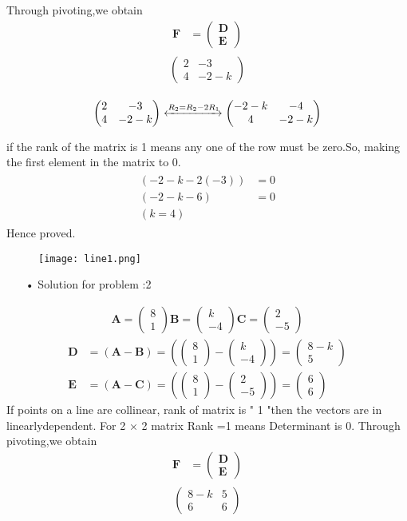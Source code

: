 \documentclass[12pt]{article}
\newcommand{\myvec}[1]{\ensuremath{\begin{pmatrix}#1\end{pmatrix}}}
\let\vec\mathbf
\providecommand{\brak}[1]{\ensuremath{\left(#1\right)}}
\let\vec\mathbf
\begin{document}
Through pivoting,we obtain
\begin{align}
\vec{F} &={\myvec{\vec{D}\\ \vec{E}}}
\end{align}
\begin{align}
\begin{split}
\myvec{
2 & -3
 \\
4 & -2-k 
}
\end{split}
\end{align}

\begin{align}
\label{eq:chem_balance_mat_row}
\myvec{
2 & -3
\\
4 & -2-k
}
 \xleftrightarrow[]{R_2 = R_2-2R_1}
\myvec{
-2-k & -4
\\
4 & -2-k
}
\end{align}

if the rank of the matrix is 1 means any one of the row must be zero.So, making the first element in the matrix to 0.
\begin{align}
\begin{split}
\brak{-2-k-2(-3)}&=0
\\
\brak{-2-k-6}&=0
\\
\brak{k=4} 
\end{split}
\end{align}
Hence proved.
\begin{figure}[h!]
	  \centering 
	  \texttt{[image: line1.png]}
	  \caption{}
	  \label{fig:line1.png}
	  \end{figure} 	    
	  
\begin{enumerate}
\item[•] Solution for problem :2
\end{enumerate}
\begin{align}  
\vec{A}=\myvec{8 \\ 1}
\vec{B}=\myvec{k \\ -4}
\vec{C}=\myvec{2 \\ -5}
\end{align}
\begin{align}  
 \vec{D} &=\brak{\vec{A}-\vec{B}} = \brak{\myvec{8 \\1 } - \myvec{k \\-4 } } = \myvec{8-k \\ 5 }\\
\vec{E} &= \brak{\vec{A}-\vec{C}} = \brak{\myvec{8 \\ 1 } - \myvec{2 \\-5 } } = \myvec{6 \\6}
\end{align}
If points on a line  are  collinear, rank of matrix is " 1 "then the vectors are in linearlydependent.
For 2 × 2 matrix Rank =1 means Determinant is 0.
Through pivoting,we obtain
\begin{align}
\vec{F} &={\myvec{\vec{D}\\ \vec{E}}}
\end{align}
\begin{align}
\begin{split}
\myvec{
8-k & 5
 \\
6 & 6
}
\end{split}
\end{align}
\end{document}
